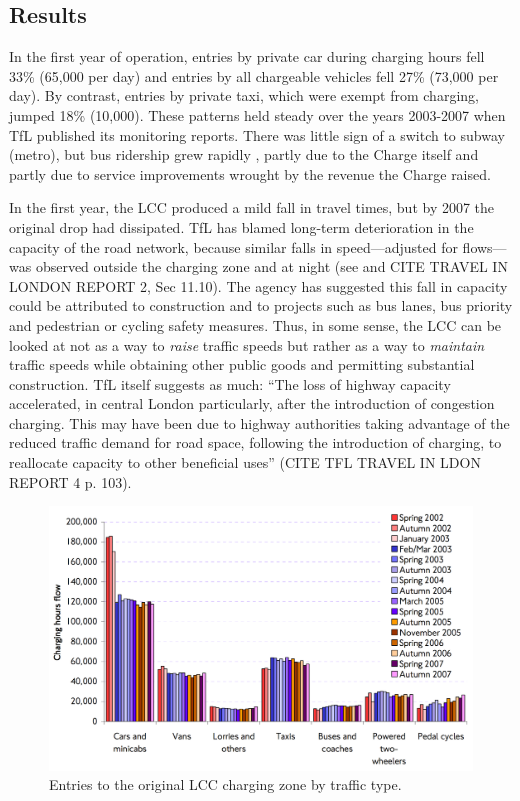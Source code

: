 \subsection{Results}

In the first year of operation, entries by private car during charging hours fell 33\% (65,000 per day) and entries by all chargeable vehicles fell 27\% (73,000 per day). By contrast, entries by private taxi, which were exempt from charging, jumped 18\% (10,000). These patterns held steady over the years 2003-2007 when TfL published its monitoring reports. There was little sign of a switch to subway (metro), but bus ridership grew rapidly \citep[p. 58]{TfLFifth2007}, partly due to the Charge itself and partly due to service improvements wrought by the revenue the Charge raised. 

In the first year, the LCC produced a mild fall in travel times, but by 2007 the original  drop had dissipated. TfL has blamed long-term deterioration in the capacity of the road network, because similar falls in speed---adjusted for flows---was observed outside the charging zone and at night (see \citet[p. 45-55]{TfLFifth2007} and CITE TRAVEL IN LONDON REPORT 2, Sec 11.10). The agency has suggested this fall in capacity could be attributed to construction and to projects such as bus lanes, bus priority and pedestrian or cycling safety measures. Thus, in some sense, the LCC can be looked at not as a way to \emph{raise} traffic speeds but rather as a way to \emph{maintain} traffic speeds while obtaining other public goods and permitting substantial construction.  TfL itself suggests as much: ``The loss of highway capacity accelerated, in central London particularly,
after the introduction of congestion charging. This may have been due to highway authorities taking advantage of the reduced traffic demand for road space, following the introduction of charging, to reallocate capacity to other beneficial uses'' (CITE TFL TRAVEL IN LDON REPORT 4 p. 103).

\begin{figure}[ht]
    \includegraphics[width=.95\textwidth]{../img/london-entries.png}
    \caption{Entries to the original LCC charging zone by traffic type. \citep[p. 20]{TfLFifth2007} } \label{fig:london-entries}
\end{figure}

